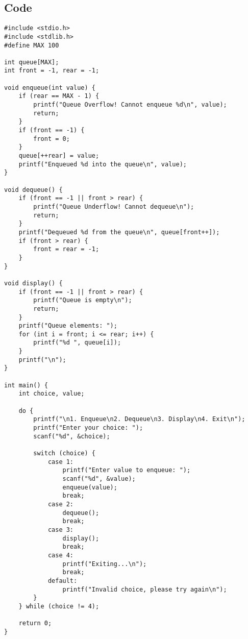 \documentclass[12pt,a4paper]{article}
\begin{document}
\subsection*{Code}
\begin{lstlisting}
#include <stdio.h>
#include <stdlib.h>
#define MAX 100

int queue[MAX];
int front = -1, rear = -1;

void enqueue(int value) {
    if (rear == MAX - 1) {
        printf("Queue Overflow! Cannot enqueue %d\n", value);
        return;
    }
    if (front == -1) {
        front = 0;
    }
    queue[++rear] = value;
    printf("Enqueued %d into the queue\n", value);
}

void dequeue() {
    if (front == -1 || front > rear) {
        printf("Queue Underflow! Cannot dequeue\n");
        return;
    }
    printf("Dequeued %d from the queue\n", queue[front++]);
    if (front > rear) {
        front = rear = -1;
    }
}

void display() {
    if (front == -1 || front > rear) {
        printf("Queue is empty\n");
        return;
    }
    printf("Queue elements: ");
    for (int i = front; i <= rear; i++) {
        printf("%d ", queue[i]);
    }
    printf("\n");
}

int main() {
    int choice, value;

    do {
        printf("\n1. Enqueue\n2. Dequeue\n3. Display\n4. Exit\n");
        printf("Enter your choice: ");
        scanf("%d", &choice);

        switch (choice) {
            case 1:
                printf("Enter value to enqueue: ");
                scanf("%d", &value);
                enqueue(value);
                break;
            case 2:
                dequeue();
                break;
            case 3:
                display();
                break;
            case 4:
                printf("Exiting...\n");
                break;
            default:
                printf("Invalid choice, please try again\n");
        }
    } while (choice != 4);

    return 0;
}
\end{lstlisting}

\newpage
\end{document}
